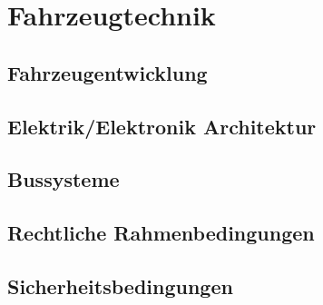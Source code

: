 \section{Fahrzeugtechnik}
\subsection{Fahrzeugentwicklung}
\subsection{Elektrik/Elektronik Architektur}
\subsection{Bussysteme}
\subsection{Rechtliche Rahmenbedingungen}
\subsection{Sicherheitsbedingungen}

